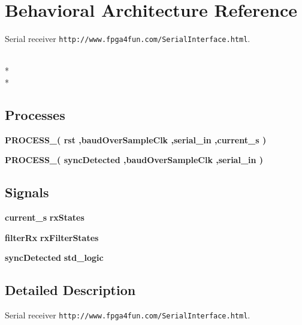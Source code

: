 \section{Behavioral Architecture Reference}
\label{classserial__receiver_1_1_behavioral}


Serial receiver {\tt http\-://www.\-fpga4fun.\-com/\-Serial\-Interface.\-html}.  


\\*
\\*
\subsection*{Processes}
 \begin{DoxyCompactItemize}
\item 
{\bf P\-R\-O\-C\-E\-S\-S\-\_}{\bfseries  ( {\bfseries {\bfseries {\bf rst}}   ,{\bfseries {\bf baud\-Over\-Sample\-Clk}}  ,{\bfseries {\bf serial\-\_\-in}}  ,current\-\_\-s } )}\label{classserial__receiver_1_1_behavioral_ab9de8543a5b6d39ef26ef4722d7af8b5}

\item 
{\bf P\-R\-O\-C\-E\-S\-S\-\_}{\bfseries  ( {\bfseries sync\-Detected  ,{\bfseries {\bf baud\-Over\-Sample\-Clk}}  ,{\bfseries {\bf serial\-\_\-in}}  } )}\label{classserial__receiver_1_1_behavioral_ab80aa4317a12ca6b2f816cf0ab4352fe}

\end{DoxyCompactItemize}
\subsection*{Signals}
 \begin{DoxyCompactItemize}
\item 
{\bf current\-\_\-s} {\bfseries rx\-States } \label{classserial__receiver_1_1_behavioral_a070c32b335fb0b7c36d9d167d6f9429e}

\item 
{\bf filter\-Rx} {\bfseries rx\-Filter\-States } \label{classserial__receiver_1_1_behavioral_a66cdf7073092ee7f8ea6be2489d6275c}

\item 
{\bf sync\-Detected} {\bfseries std\-\_\-logic } \label{classserial__receiver_1_1_behavioral_a6d527d68c49db3e73c2339ce66d8c067}

\end{DoxyCompactItemize}


\subsection{Detailed Description}
Serial receiver {\tt http\-://www.\-fpga4fun.\-com/\-Serial\-Interface.\-html}. 

